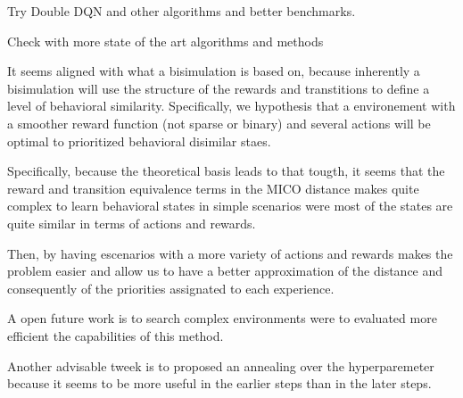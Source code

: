 Try Double DQN and other algorithms and better benchmarks.

Check with more state of the art algorithms and methods





It seems aligned with what a bisimulation is based on, because inherently a bisimulation will use the structure of the rewards and transtitions to define a level of behavioral similarity.
Specifically, we hypothesis that a environement with a smoother reward function (not sparse or binary) and several actions will be optimal to prioritized behavioral disimilar staes. 

Specifically, because the theoretical basis leads to that tougth, it seems that the reward and transition equivalence terms in the MICO distance makes quite complex to learn behavioral states in simple scenarios were most of the states are quite similar in terms of actions and rewards. 

Then, by having escenarios with a more variety of actions and rewards makes the problem easier and allow us to have a better approximation of the distance and consequently of the priorities assignated to each experience. 

A open future work is to search complex environments were to evaluated more efficient the capabilities of this method. 


Another advisable tweek is to proposed an annealing over the hyperparemeter because it seems to be more useful in the earlier steps than in the later steps.






